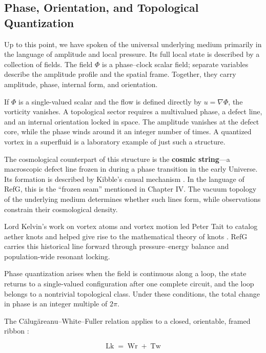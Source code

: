 \documentclass[11pt,a4paper]{article}
\begin{document}
\subsection{Phase, Orientation, and Topological Quantization}

Up to this point, we have spoken of the universal underlying medium primarily in the language of amplitude and local pressure. Its full local state is described by a collection of fields. The field $\Phi$ is a phase--clock scalar field; separate variables describe the amplitude profile and the spatial frame. Together, they carry amplitude, phase, internal form, and orientation.

If $\Phi$ is a single-valued scalar and the flow is defined directly by $u=\nabla\Phi$, the vorticity vanishes. A topological sector requires a multivalued phase, a defect line, and an internal orientation locked in space. The amplitude vanishes at the defect core, while the phase winds around it an integer number of times. A quantized vortex in a superfluid is a laboratory example of just such a structure.

The cosmological counterpart of this structure is the \textbf{cosmic string}---a macroscopic defect line frozen in during a phase transition in the early Universe. Its formation is described by Kibble's causal mechanism \citep{kibble1976}. In the language of RefG, this is the ``frozen seam'' mentioned in Chapter IV. The vacuum topology of the underlying medium determines whether such lines form, while observations constrain their cosmological density.

Lord Kelvin's work on vortex atoms and vortex motion \citep{thomson1867,thomson1869} led Peter Tait to catalog aether knots and helped give rise to the mathematical theory of knots \citep{tait1877}. RefG carries this historical line forward through pressure--energy balance and population-wide resonant locking.

Phase quantization arises when the field is continuous along a loop, the state returns to a single-valued configuration after one complete circuit, and the loop belongs to a nontrivial topological class. Under these conditions, the total change in phase is an integer multiple of $2\pi$.

The Călugăreanu--White--Fuller relation applies to a closed, orientable, framed ribbon \citep{calugareanu1961,white1969,fuller1971,ricca2011}:

\begin{equation}
\operatorname{Lk}=\operatorname{Wr}+\operatorname{Tw}
\label{eq:self-linking}
\end{equation}
\end{document}

